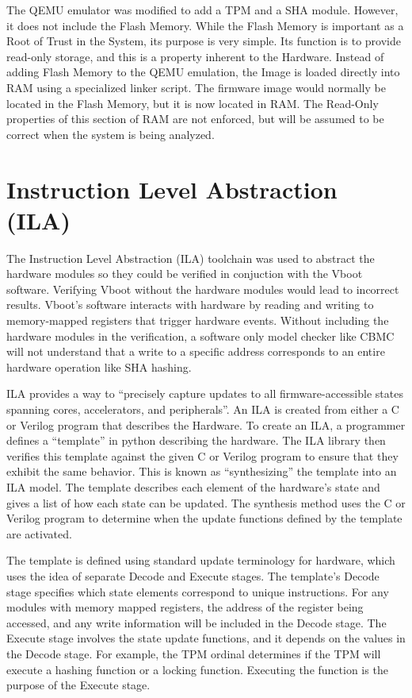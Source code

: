 The QEMU emulator was modified to add a TPM and a SHA module. 
However, it does not include the Flash Memory.
While the Flash Memory is important as a Root of Trust in the System, its purpose is very simple.
Its function is to provide read-only storage, and this is a property inherent to
the Hardware.
Instead of adding Flash Memory to the QEMU emulation, the Image is loaded
directly into RAM using a specialized linker script. %
The firmware image would normally be located in the Flash Memory, but it is now
located in RAM\@.
The Read-Only properties of this section of RAM are not enforced, but will be
assumed to be correct when the system is being analyzed.

\section{Instruction Level Abstraction (ILA)}

The Instruction Level Abstraction (ILA) toolchain was used to abstract the
hardware modules so they could be verified in conjuction with the Vboot software.
Verifying Vboot without the hardware modules would lead to incorrect results. 
Vboot's software interacts with hardware by reading and
writing to memory-mapped registers that trigger hardware events.
Without including the hardware modules in the verification, a software only model 
checker like CBMC will not understand that a write to a specific address corresponds to
an entire hardware operation like SHA hashing.


ILA provides a way to ``precisely capture updates to all firmware-accessible
states spanning cores, accelerators, and peripherals''\cite{ila-template}.
An ILA is created from either a C or Verilog program that describes the
Hardware.
To create an ILA, a programmer defines a ``template'' in python describing the
hardware.
The ILA library then verifies this template against the given C or Verilog
program to ensure that they exhibit the same behavior.
This is known as ``synthesizing'' the template into an ILA model.
The template describes each element of the hardware's state and gives a list of
how each state can be updated.
The synthesis method uses the C or Verilog program to determine when the update
functions defined by the template are activated.

The template is defined using standard update terminology for hardware, which
uses the idea of separate Decode and Execute stages.
The template's Decode stage specifies which state elements correspond to unique
instructions.
For any modules with memory mapped registers, the address of the register being
accessed, and any write information will be included in the Decode stage. 
The Execute stage involves the state update functions, and it depends on the
values in the Decode stage.
For example, the TPM ordinal determines if the TPM will execute a hashing
function or a locking function.
Executing the function is the purpose of the Execute stage.

